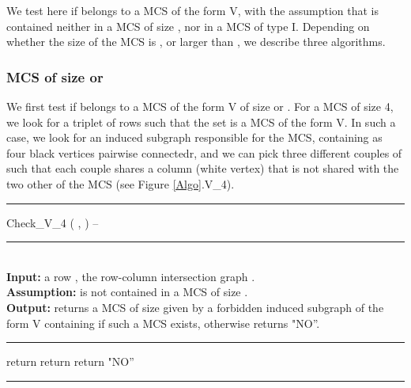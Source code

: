 \documentclass{article}
\begin{document}
We test here if  belongs to a MCS of the form V, with the assumption that  
 is contained neither in a MCS of size , nor in a MCS of type I.
Depending on whether the size of the MCS is ,  or larger than , 
we describe three algorithms.

\subsubsection{MCS of size  or }

We first test if  belongs to a MCS of the form V of size  or .
For a MCS of size 4, we look  for a triplet of rows 
 such that the set  is a MCS of the
form V. In such a case, we look for an induced
subgraph responsible for the MCS, containing  as four black 
vertices pairwise connectedr, and we can pick three different couples of
 such that each couple shares a column (white vertex) that 
is not shared with the two other of the MCS (see Figure \ref{Algo}.V\_4). 

\begin{algorithm}[htpb]                      
\rule{11.7cm}{0.01cm}
\caption{Check\_V\_4 ( , ) -- } 
\rule{11.7cm}{0.01cm}
\\
{\bf Input:} a row , the row-column intersection graph .\\
{\bf Assumption:}   is not contained in a MCS of size .\\
{\bf Output:} returns a MCS  of size  given by a forbidden 
induced subgraph of the form V containing  if such a MCS exists, otherwise returns  "NO''.
\rule{11.7cm}{0.01cm}
\begin{algorithmic}[1]
\IF{}
\STATE return 
\ENDIF
\IF{}
\STATE return 
\ENDIF
\ENDIF
\ENDFOR 
\STATE return "NO''
\end{algorithmic}
\rule{11.7cm}{0.01cm}
\end{algorithm}
\end{document}
